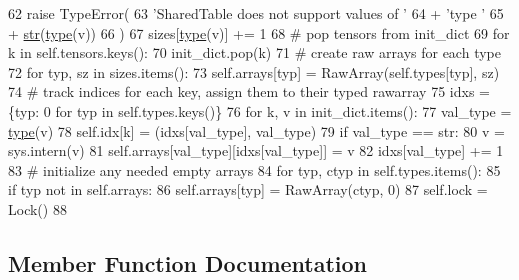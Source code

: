 \begin{DoxyCode}
62                     \textcolor{keywordflow}{raise} TypeError(
63                         \textcolor{stringliteral}{'SharedTable does not support values of '}
64                         + \textcolor{stringliteral}{'type '}
65                         + \hyperlink{namespacegenerate__task__READMEs_a5b88452ffb87b78c8c85ececebafc09f}{str}(\hyperlink{namespaceparlai_1_1agents_1_1tfidf__retriever_1_1build__tfidf_ad5dfae268e23f506da084a9efb72f619}{type}(v))
66                     )
67                 sizes[\hyperlink{namespaceparlai_1_1agents_1_1tfidf__retriever_1_1build__tfidf_ad5dfae268e23f506da084a9efb72f619}{type}(v)] += 1
68             \textcolor{comment}{# pop tensors from init\_dict}
69             \textcolor{keywordflow}{for} k \textcolor{keywordflow}{in} self.tensors.keys():
70                 init\_dict.pop(k)
71             \textcolor{comment}{# create raw arrays for each type}
72             \textcolor{keywordflow}{for} typ, sz \textcolor{keywordflow}{in} sizes.items():
73                 self.arrays[typ] = RawArray(self.types[typ], sz)
74             \textcolor{comment}{# track indices for each key, assign them to their typed rawarray}
75             idxs = \{typ: 0 \textcolor{keywordflow}{for} typ \textcolor{keywordflow}{in} self.types.keys()\}
76             \textcolor{keywordflow}{for} k, v \textcolor{keywordflow}{in} init\_dict.items():
77                 val\_type = \hyperlink{namespaceparlai_1_1agents_1_1tfidf__retriever_1_1build__tfidf_ad5dfae268e23f506da084a9efb72f619}{type}(v)
78                 self.idx[k] = (idxs[val\_type], val\_type)
79                 \textcolor{keywordflow}{if} val\_type == str:
80                     v = sys.intern(v)
81                 self.arrays[val\_type][idxs[val\_type]] = v
82                 idxs[val\_type] += 1
83         \textcolor{comment}{# initialize any needed empty arrays}
84         \textcolor{keywordflow}{for} typ, ctyp \textcolor{keywordflow}{in} self.types.items():
85             \textcolor{keywordflow}{if} typ \textcolor{keywordflow}{not} \textcolor{keywordflow}{in} self.arrays:
86                 self.arrays[typ] = RawArray(ctyp, 0)
87         self.lock = Lock()
88 
\end{DoxyCode}


\subsection{Member Function Documentation}
\mbox{\label{classparlai_1_1utils_1_1thread_1_1SharedTable_afac82c3717ad0344c5bdfc7b8913d796}} 

